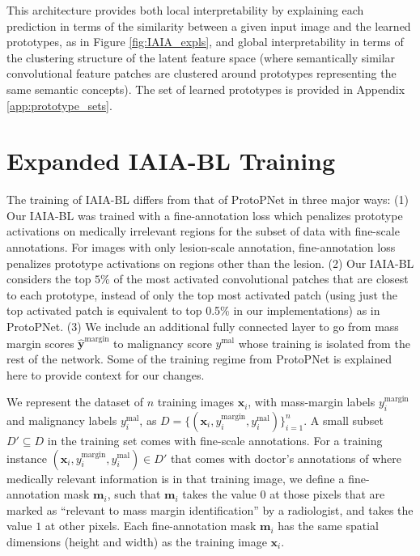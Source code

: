 \documentclass[11pt]{article}
\begin{document}
This architecture provides both local interpretability by explaining each prediction in terms of the similarity between a given input image and the learned prototypes, as in Figure \ref{fig:IAIA_expls}, and global interpretability in terms of the clustering structure of the latent feature space (where semantically similar convolutional feature patches are clustered around prototypes representing the same semantic concepts). The set of learned prototypes is provided in Appendix \ref{app:prototype_sets}.
\FloatBarrier
\section{Expanded IAIA-BL Training}

The training of IAIA-BL differs from that of ProtoPNet \citep{PPNet} in three major ways: (1) Our IAIA-BL was trained with a fine-annotation loss which penalizes prototype activations on medically irrelevant regions for the subset of data with fine-scale annotations. For images with only lesion-scale annotation, fine-annotation loss penalizes prototype activations on regions other than the lesion. (2) Our IAIA-BL considers the top $5\%$ of the most activated convolutional patches that are closest to each prototype, instead of only the top most activated patch (using just the top activated patch is equivalent to top 0.5\% in our implementations) as in ProtoPNet. (3) We include an additional fully connected layer to go from mass margin scores $\hat{\mathbf{y}}^{\text{margin}}$ to malignancy score $y^{\text{mal}}$ whose training is isolated from the rest of the network. 
Some of the training regime from ProtoPNet is explained here to provide context for our changes. 

We represent the dataset of $n$ training images $\mathbf{x}_i$, with mass-margin labels $y^{\text{margin}}_i$ and malignancy labels $y_i^{\text{mal}}$, as $D=\{(\mathbf{x}_i, y^{\text{margin}}_i, y_i^{\text{mal}})\}_{i=1}^n$. A small subset $D' \subseteq D$ in the training set comes with fine-scale annotations. For a training instance $(\mathbf{x}_i, y^{\text{margin}}_i, y_i^{\text{mal}}) \in D'$ that comes with doctor's annotations of where medically relevant information is in that training image, we define a fine-annotation mask $\textbf{m}_i$, such that $\textbf{m}_i$ takes the value $0$ at those pixels that are marked as ``relevant to mass margin identification'' by a radiologist, and takes the value $1$ at other pixels. Each fine-annotation mask $\textbf{m}_i$ has the same spatial dimensions (height and width) as the training image $\textbf{x}_i$.
\end{document}
